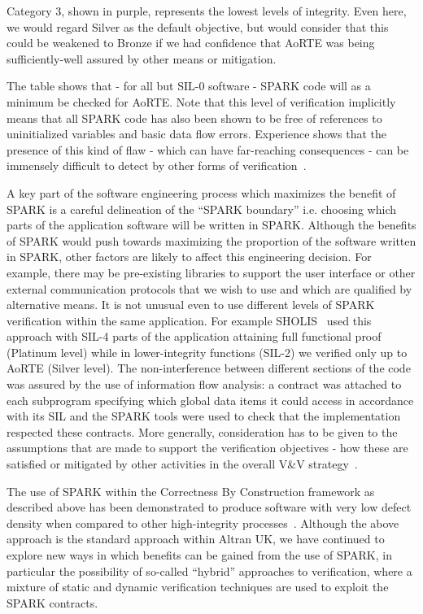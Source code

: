 \documentclass{llncs}
\begin{document}
Category 3, shown in purple, represents the lowest levels of integrity. Even
here, we would regard Silver as the default objective, but would consider that
this could be weakened to Bronze if we had confidence that AoRTE was being
sufficiently-well assured by other means or mitigation.

The table shows that - for all but SIL-0 software - SPARK code will as a
minimum be checked for AoRTE. Note that this level of verification implicitly
means that all SPARK code has also been shown to be free of references to
uninitialized variables and basic data flow errors.  Experience shows that the
presence of this kind of flaw - which can have far-reaching consequences - can
be immensely difficult to detect by other forms of
verification~\cite{King2000TSE}.

A key part of the software engineering process which maximizes the benefit of
SPARK is a careful delineation of the ``SPARK boundary'' i.e. choosing which
parts of the application software will be written in SPARK. Although the
benefits of SPARK would push towards maximizing the proportion of the software
written in SPARK, other factors are likely to affect this engineering
decision. For example, there may be pre-existing libraries to support the user
interface or other external communication protocols that we wish to use and
which are qualified by alternative means. It is not unusual even to use
different levels of SPARK verification within the same application. For example
SHOLIS~\cite{Croxford2005Manifesto} used this approach with SIL-4 parts of the
application attaining full functional proof (Platinum level) while in
lower-integrity functions (SIL-2) we verified only up to AoRTE (Silver level).
The non-interference between different sections of the code was assured by the
use of information flow analysis: a contract was attached to each subprogram
specifying which global data items it could access in accordance with its SIL
and the SPARK tools were used to check that the implementation respected these
contracts. More generally, consideration has to be given to the assumptions
that are made to support the verification objectives - how these are satisfied
or mitigated by other activities in the overall V\&V
strategy~\cite{kanig2014tap}.

The use of SPARK within the Correctness By Construction framework as described
above has been demonstrated to produce software with very low defect density
when compared to other high-integrity
processes~\cite{Croxford2005Manifesto}. Although the above approach is the
standard approach within Altran UK, we have continued to explore new ways in
which benefits can be gained from the use of SPARK, in particular the
possibility of so-called ``hybrid'' approaches to verification, where a mixture
of static and dynamic verification techniques are used to exploit the SPARK
contracts.
\end{document}
